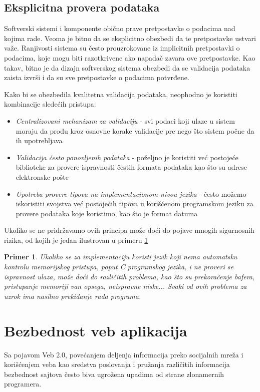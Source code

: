 \documentclass[a4paper]{article}
\newtheorem{primer}{Primer}[section]
\begin{document}
\subsection{Eksplicitna provera podataka}
Softverski sistemi i komponente obično prave pretpostavke o podacima nad kojima rade. Veoma je bitno da se eksplicitno obezbedi da te pretpostavke ustvari važe. Ranjivosti sistema su često prouzrokovane iz implicitnih pretpostavki o podacima, koje mogu biti razotkrivene ako napadač zavara ove pretpostavke.
Kao takav, bitno je da dizajn softverskog sistema obezbedi da se validacija podataka zaista izvrši i da su sve 
pretpostavke o podacima potvrđene.

Kako bi se obezbedila kvalitetna validacija podataka, neophodno je koristiti kombinacije sledećih pristupa:
\begin{itemize}
	\item \textit{Centralizovani mehanizam za validaciju} - svi podaci koji ulaze u sistem moraju da prođu kroz osnovne korake validacije pre nego što sistem počne da ih upotrebljava
	\item \textit{Validacija često ponovljenih podataka} - poželjno je koristiti već postojeće biblioteke za provere ispravnosti čestih formata podataka kao što su adrese elektronske pošte
	\item \textit{Upotreba provere tipova na implementacionom nivou jezika} - često možemo iskoristiti svojstva već postojećih tipova u korišćenom programskom jeziku za provere podataka koje koristimo, kao što je format datuma
\end{itemize}
Ukoliko se ne pridržavamo ovih principa može doći do pojave mnogih sigurnosnih rizika, od kojih je jedan ilustrovan u primeru \ref{primer5}

\begin{primer}
	\label{primer5}
	Ukoliko se za implementaciju koristi jezik koji nema automatsku kontrolu memorijskog pristupa, poput C programskog jezika, i ne proveri se ispravnost ulaza, može doći do različitih problema, kao što su prekoračenje bafera, pristupanje memoriji van opsega, neispravne niske... Svaki od ovih problema za uzrok ima nasilno prekidanje rada programa.
\end{primer}

\section{Bezbednost veb aplikacija}

Sa pojavom Veb 2.0, povećanjem deljenja informacija preko socijalnih mreža i korišćenjem veba kao sredstva poslovanja i pružanja različitih informacija bezbednost sajtova često biva ugrožena upadima od strane zlonamernih programera.
\end{document}
